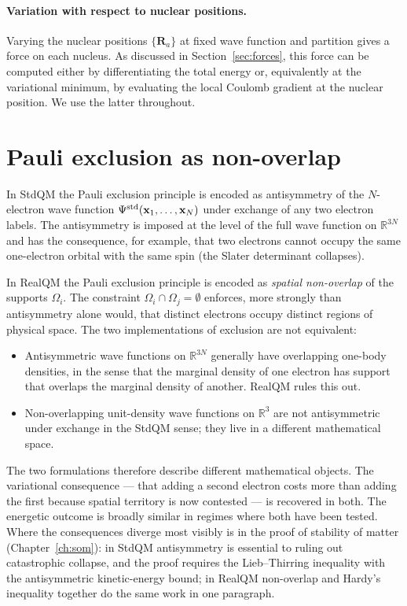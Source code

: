 \paragraph{Variation with respect to nuclear positions.} Varying the nuclear positions $\{\mathbf{R}_a\}$ at fixed wave function and partition gives a force on each nucleus. As discussed in Section~\ref{sec:forces}, this force can be computed either by differentiating the total energy or, equivalently at the variational minimum, by evaluating the local Coulomb gradient at the nuclear position. We use the latter throughout.

\section{Pauli exclusion as non-overlap}\label{sec:pauli-nonoverlap}

In StdQM the Pauli exclusion principle is encoded as antisymmetry of the $N$-electron wave function $\Psi^{\rm std}(\mathbf{x}_1, \ldots, \mathbf{x}_N)$ under exchange of any two electron labels. The antisymmetry is imposed at the level of the full wave function on $\mathbb{R}^{3N}$ and has the consequence, for example, that two electrons cannot occupy the same one-electron orbital with the same spin (the Slater determinant collapses).

In RealQM the Pauli exclusion principle is encoded as \emph{spatial non-overlap} of the supports $\Omega_i$. The constraint $\Omega_i \cap \Omega_j = \emptyset$ enforces, more strongly than antisymmetry alone would, that distinct electrons occupy distinct regions of physical space. The two implementations of exclusion are not equivalent:
\begin{itemize}
\item Antisymmetric wave functions on $\mathbb{R}^{3N}$ generally have overlapping one-body densities, in the sense that the marginal density of one electron has support that overlaps the marginal density of another. RealQM rules this out.
\item Non-overlapping unit-density wave functions on $\mathbb{R}^3$ are not antisymmetric under exchange in the StdQM sense; they live in a different mathematical space.
\end{itemize}
The two formulations therefore describe different mathematical objects. The variational consequence --- that adding a second electron costs more than adding the first because spatial territory is now contested --- is recovered in both. The energetic outcome is broadly similar in regimes where both have been tested. Where the consequences diverge most visibly is in the proof of stability of matter (Chapter~\ref{ch:som}): in StdQM antisymmetry is essential to ruling out catastrophic collapse, and the proof requires the Lieb--Thirring inequality with the antisymmetric kinetic-energy bound; in RealQM non-overlap and Hardy's inequality together do the same work in one paragraph.

